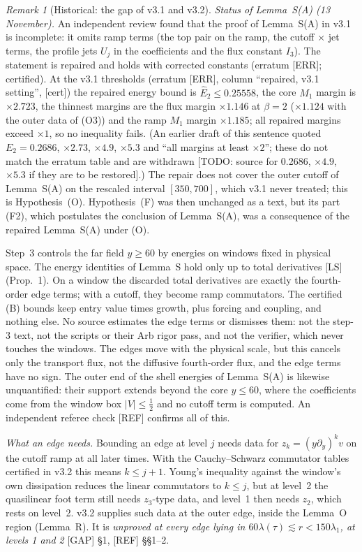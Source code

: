 \documentclass[11pt]{amsart}
\theoremstyle{definition}
\theoremstyle{remark}
\newtheorem{remark}[theorem]{Remark}
\newcommand{\dref}[1]{[\textsf{#1}]}
\begin{document}
\begin{remark}[Historical: the gap of v3.1 and v3.2]
\emph{Status of Lemma~S(A) (13 November).} An independent review found that the proof of Lemma~S(A) in v3.1 is incomplete: it omits ramp terms (the top pair on the ramp, the cutoff $\times$ jet terms, the profile jets $U_j$ in the coefficients and the flux constant $I_3$). The statement is repaired and holds with corrected constants (erratum \dref{ERR}; certified). At the v3.1 thresholds (erratum \dref{ERR}, column ``repaired, v3.1 setting'', \textup{[cert]}) the repaired energy bound is $\hat E_2\le0.25558$, the core $M_1$ margin is $\times2.723$, the thinnest margins are the flux margin $\times1.146$ at $\beta=2$ ($\times1.124$ with the outer data of (O3)) and the ramp $M_1$ margin $\times1.185$; all repaired margins exceed $\times1$, so no inequality fails. (An earlier draft of this sentence quoted $E_2=0.2686$, $\times2.73$, $\times4.9$, $\times5.3$ and ``all margins at least $\times2$''; these do not match the erratum table and are withdrawn [TODO: source for 0.2686, $\times4.9$, $\times5.3$ if they are to be restored].) The repair does not cover the outer cutoff of Lemma~S(A) on the rescaled interval $[350,700]$, which v3.1 never treated; this is Hypothesis~(O). Hypothesis~(F) was then unchanged as a text, but its part (F2), which postulates the conclusion of Lemma~S(A), was a consequence of the repaired Lemma~S(A) under (O).


Step~3 controls the far field $y\ge60$ by energies on windows fixed in physical space. The energy identities of Lemma~S hold only up to total derivatives \dref{LS} (Prop.~1). On a window the discarded total derivatives are exactly the fourth-order edge terms; with a cutoff, they become ramp commutators. The certified (B) bounds keep entry value times growth, plus forcing and coupling, and nothing else. No source estimates the edge terms or dismisses them: not the step-3 text, not the scripts or their Arb rigor pass, and not the verifier, which never touches the windows. The edges move with the physical scale, but this cancels only the transport flux, not the diffusive fourth-order flux, and the edge terms have no sign. The outer end of the shell energies of Lemma~S(A) is likewise unquantified: their support extends beyond the core $y\le60$, where the coefficients come from the window box $|V|\le\frac12$ and no cutoff term is computed. An independent referee check \dref{REF} confirms all of this.

\emph{What an edge needs.} Bounding an edge at level $j$ needs data for $z_k=(y\partial_y)^kv$ on the cutoff ramp at all later times. With the Cauchy--Schwarz commutator tables certified in v3.2 this means $k\le j+1$. Young's inequality against the window's own dissipation reduces the linear commutators to $k\le j$, but at level~2 the quasilinear foot term still needs $z_3$-type data, and level~1 then needs $z_2$, which rests on level~2. v3.2 supplies such data at the outer edge, inside the Lemma~O region (Lemma~R). It is \emph{unproved at every edge lying in $60\lambda(\tau)\lesssim r<150\lambda_1$, at levels 1 and 2} \dref{GAP} \S1, \dref{REF} \S\S1--2.


\end{remark}
\end{document}
